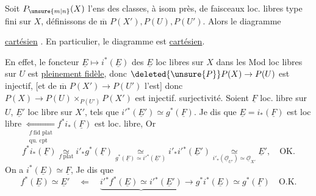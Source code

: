 
Soit $P_{\unsure{m|n}}(X)$ l'ens des classes, à isom près, de faisceaux loc. libres  type fini sur $X$, définissons de $\overline{\mathrm m}$ $P(X'),P(U),P(U')$. Alors le diagramme


\uline{cartésien} . En particulier, le diagramme
est \uline{cartésien}.

En effet,  le foncteur $\underline E\mapsto i^*(\underline E)$ des $\underline E$ loc libres sur $X$ dans les Mod loc libres sur $U$ est \uline{pleinement fidèle}, donc $\deleted{\unsure{P}}P(X)\to P(U)$ est injectif, [et de $\overline{\mathrm m}$ $P(X')\to P(U')$ l'est] donc $P(X)\to P(U)\times_{P(U')}P(X')$ est injectif.   surjectivité. Soient $\underline F$ loc. libre sur $U$, $\underline E'$ loc libre sur $X'$, tels que $i'{}^*(\underline E')\simeq g^*(\underline F)$. Je dis que $\underline E=i_*(\underline F)$ est loc libre $\underset{\substack{f\ \text{fid plat}\\\text{qu. cpt}}}{\Leftarrow} f^* i_*(\underline F)$ est loc. libre, Or
\[
f^*i_*(\underline F)\underset{f\ \mathrm{plat}}{\simeq} i'_*g^*(\underline F)\underset{g^*(\underline F)\simeq i'{}^*(\underline E')}{\simeq} i'_*i'{}^*(\underline E')\underset{i'_*(\underline{\mathcal O}_{U'})\simeq\underline{\mathcal O}_{X'}}{\simeq}\underline E',\quad\text{OK.}
\]
On a $i^*(\underline E)\simeq\underline F$, Je dis que
\[
 f^*(\underline E)\simeq\underline E'\quad \Longleftarrow\quad
 \underbrace{i'{}^*f^*(\underline E)\simeq i'{}^*(\underline E')}\longrightarrow
 g^*i^*(\underline E)\simeq g^*(\underline F)
 \quad\text{O.K.}
\]

